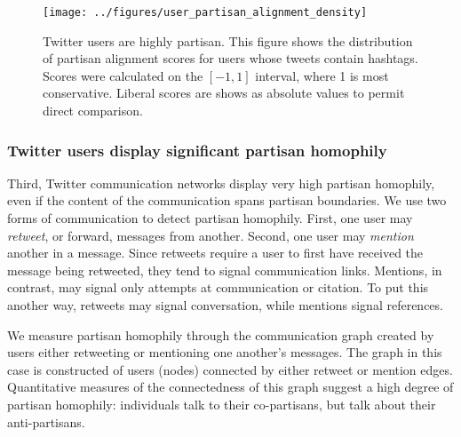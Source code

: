 \documentclass{article}
\begin{document}
\begin{figure}[ht]
  \centering
  \texttt{[image: ../figures/user\_partisan\_alignment\_density]}
  \caption{Twitter users are highly partisan. This figure shows the distribution of partisan alignment
    scores for users whose tweets contain hashtags. Scores were
    calculated on the $[-1 , 1]$ interval, where 1 is most
    conservative. Liberal scores are shows as absolute values to permit direct comparison.}
  \label{fig:user-pscore-distribution}
\end{figure}




\subsubsection{Twitter users display significant partisan homophily}
\label{sec:twitt-users-displ}

Third, Twitter communication networks display very high partisan
homophily, even if the content of the communication spans partisan
boundaries. We use two forms of communication to detect partisan
homophily. First, one user may \textit{retweet}, or forward, messages
from another. Second, one user may \textit{mention} another in a
message. Since retweets require a user to first have received the
message being retweeted, they tend to signal communication
links. Mentions, in contrast, may signal only attempts at
communication or citation. To put this another way, retweets may
signal conversation, while mentions signal references.

We measure partisan homophily through the communication graph created
by users either retweeting or mentioning one another's messages. The
graph in this case is constructed of users (nodes) connected by either
retweet or mention edges. Quantitative measures of the connectedness
of this graph suggest a high degree of partisan homophily: individuals
talk to their co-partisans, but talk about their anti-partisans.
\end{document}

